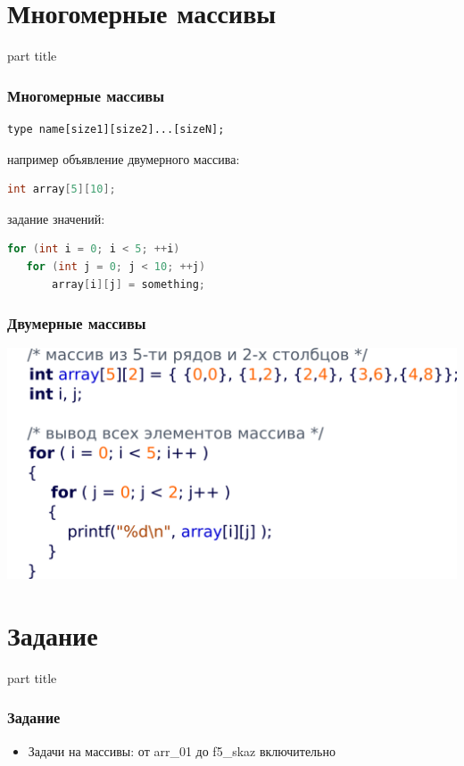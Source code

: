 \documentclass[14pt,pdf,hyperref={unicode}]{beamer}
\begin{document}
\section{Многомерные массивы}
\begin{frame}
\begin{center}
\begin{beamercolorbox}[sep=8pt,center]{part
title}
\insertsection
\end{beamercolorbox}
\end{center}
\end{frame}

\begin{frame}[fragile]
\frametitle{Многомерные массивы} 
\begin{verbatim}
type name[size1][size2]...[sizeN];
\end{verbatim}
например объявление двумерного массива:
\begin{lstlisting}[language=C++,basicstyle=\ttfamily,keywordstyle=\color{blue}]
int array[5][10];
\end{lstlisting}
задание значений:
\begin{lstlisting}[language=C++,basicstyle=\ttfamily,keywordstyle=\color{blue}, showtabs]
for (int i = 0; i < 5; ++i)
   for (int j = 0; j < 10; ++j)
       array[i][j] = something;
\end{lstlisting}
\end{frame}


\begin{frame}[fragile]
\frametitle{Двумерные массивы} 
\begin{center}
\includegraphics[scale=0.95]{images/twodim_array.png}
\end{center}
\end{frame}

\section{Задание}
\begin{frame}
\begin{center}
\begin{beamercolorbox}[sep=8pt,center]{part
title}
\insertsection
\end{beamercolorbox}
\end{center}
\end{frame}

\begin{frame}[fragile]
\frametitle{Задание} 
\begin{itemize}
\item Задачи на массивы: от arr\_01 до f5\_skaz включительно
\end{itemize}
\end{frame}
\end{document}
